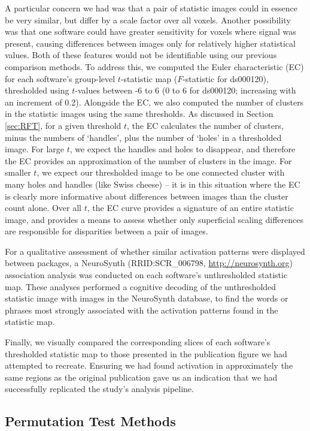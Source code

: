 A particular concern we had was that a pair of statistic images could in essence be very similar, but differ by a scale factor over all voxels. Another possibility was that one software could have greater sensitivity for voxels where signal was present, causing differences between images only for relatively higher statistical values. Both of these features would not be identifiable using our previous comparison methods. To address this, we computed the Euler characteristic (EC) for each software's group-level $t$-statistic map ($F$-statistic for ds000120), thresholded using $t$-values between -6 to 6 (0 to 6 for ds000120; increasing with an increment of 0.2). Alongside the EC, we also computed the number of clusters in the statistic images using the same thresholds. As discussed in Section \ref{sec:RFT}, for a given threshold $t$, the EC calculates the number of clusters, minus the numbers of `handles', plus the number of `holes' in a thresholded image. For large $t$, we expect the handles and holes to disappear, and therefore the EC provides an approximation of the number of clusters in the image. For smaller $t$, we expect our thresholded image to be one connected cluster with many holes and handles (like Swiss cheese) -- it is in this situation where the EC is clearly more informative about differences between images than the cluster count alone. Over all $t$, the EC curve provides a signature of an entire statistic image, and provides a means to assess whether only  superficial scaling differences are responsible for disparities between a pair of images.

For a qualitative assessment of whether similar activation patterns were displayed between packages, a NeuroSynth (RRID:SCR\_006798, \href{http://neurosynth.org}{http://neurosynth.org}) association analysis was conducted on each software's unthresholded statistic map.  These analyses performed a cognitive decoding of the unthresholded statistic image with images in the NeuroSynth database, to find the words or phrases most strongly associated with the activation patterns found in the statistic map. 

Finally, we visually compared the corresponding slices of each software's thresholded statistic map to those presented in the publication figure we had attempted to recreate. Ensuring we had found activation in approximately the same regions as the original publication gave us an indication that we had successfully replicated the study's analysis pipeline.

\subsection{Permutation Test Methods}

